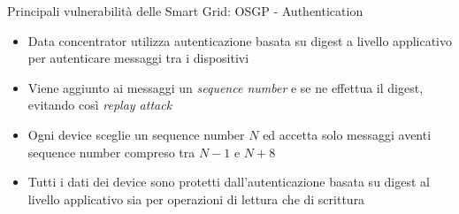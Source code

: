 \begin{frame}{Principali vulnerabilità delle Smart Grid: OSGP - Authentication}
	\begin{itemize}[<+- | alert@+>]
		\item Data concentrator utilizza autenticazione basata su digest a livello applicativo per autenticare messaggi tra i dispositivi
		\item Viene aggiunto ai messaggi un \emph{sequence number} e se ne effettua il digest, evitando così \emph{replay attack}
		\item Ogni device sceglie un sequence number $N$ ed accetta solo messaggi aventi sequence number compreso tra $N-1$ e $N+8$
		\item Tutti i dati dei device sono protetti dall’autenticazione basata su digest al livello applicativo sia per operazioni di lettura che di scrittura

	\end{itemize}
\end{frame}

%


